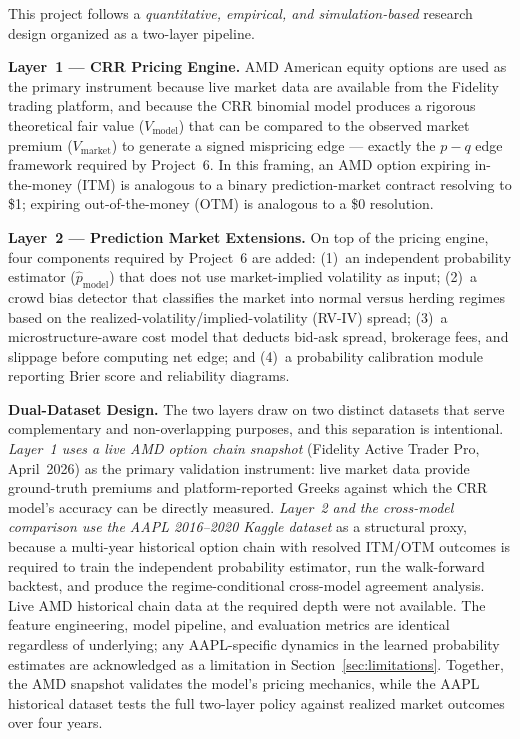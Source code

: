 \documentclass[12pt, letterpaper]{article}
\begin{document}
This project follows a \textit{quantitative, empirical, and
simulation-based} research design organized as a two-layer pipeline.

\textbf{Layer~1 --- CRR Pricing Engine.} AMD American equity options
are used as the primary instrument because live market data are
available from the Fidelity trading platform, and because the CRR
binomial model produces a rigorous theoretical fair value
($V_{\text{model}}$) that can be compared to the observed market
premium ($V_{\text{market}}$) to generate a signed mispricing edge
--- exactly the $p - q$ edge framework required by Project~6. In
this framing, an AMD option expiring in-the-money (ITM) is analogous
to a binary prediction-market contract resolving to \$1; expiring
out-of-the-money (OTM) is analogous to a \$0 resolution.

\textbf{Layer~2 --- Prediction Market Extensions.} On top of the
pricing engine, four components required by Project~6 are added:
(1)~an independent probability estimator ($\hat{p}_{\text{model}}$)
that does not use market-implied volatility as input; (2)~a crowd
bias detector that classifies the market into normal versus herding
regimes based on the realized-volatility/implied-volatility (RV-IV)
spread; (3)~a microstructure-aware cost model that deducts bid-ask
spread, brokerage fees, and slippage before computing net edge; and
(4)~a probability calibration module reporting Brier score and
reliability diagrams.

\textbf{Dual-Dataset Design.} The two layers draw on two distinct
datasets that serve complementary and non-overlapping purposes, and
this separation is intentional. \emph{Layer~1 uses a live AMD option
chain snapshot} (Fidelity Active Trader Pro, April~2026) as the
primary validation instrument: live market data provide ground-truth
premiums and platform-reported Greeks against which the CRR model's
accuracy can be directly measured. \emph{Layer~2 and the cross-model
comparison use the AAPL 2016--2020 Kaggle dataset} as a structural
proxy, because a multi-year historical option chain with resolved
ITM/OTM outcomes is required to train the independent probability
estimator, run the walk-forward backtest, and produce the
regime-conditional cross-model agreement analysis. Live AMD historical
chain data at the required depth were not available. The feature
engineering, model pipeline, and evaluation metrics are identical
regardless of underlying; any AAPL-specific dynamics in the learned
probability estimates are acknowledged as a limitation in
Section~\ref{sec:limitations}. Together, the AMD snapshot validates
the model's pricing mechanics, while the AAPL historical dataset tests
the full two-layer policy against realized market outcomes over four
years.
\end{document}
